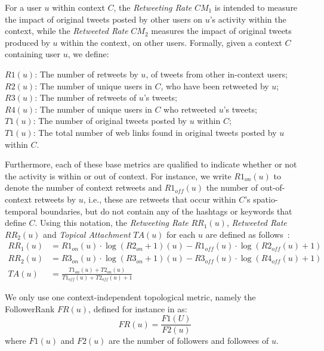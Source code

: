 \documentclass[runningheads]{llncs}
\begin{document}
For a user $u$ within context $C$, the \textit{Retweeting Rate}  $CM_1$ is intended to measure the impact of  original tweets posted  by other users on $u$'s activity within the context, while the \textit{Retweeted Rate} $CM_2$  measures the impact of original tweets produced by $u$ within the context, on other users.
Formally, given a context $C$ containing user $u$, we define:

\noindent 
$R1(u)$: The number of retweets by $u$, of tweets from other in-context users;\\
$R2(u)$: The number of unique users in $C$, who have been retweeted by $u$; \\
$R3(u)$: The number of retweets of $u$'s  tweets; \\
$R4(u)$: The number of unique users in $C$ who retweeted $u$'s tweets; \\
$T1(u)$: The number of original tweets posted by $u$ within $C$; \\
$T1(u)$: The total number of web links found in original tweets posted by $u$ within $C$.

Furthermore, each of these base metrics  are qualified to indicate whether or not the activity is within or out of context.
For instance, we write $R1_{on}(u)$ to denote the number of context retweets and $R1_{off}(u)$ the number of out-of-context retweets by $u$, i.e., these are retweets that occur within $C$'s spatio-temporal boundaries, but do not contain any of the hashtags or keywords that define $C$.  
Using this notation, the \textit{Retweeting Rate} $RR_1(u)$, \textit{Retweeted Rate} $RR_2(u)$ and \textit{Topical Attachment} $TA(u)$ for each $u$ are defined as follows~\cite{Bizid:2015}:
\begin{align}
RR_1(u) & =  R1_{on}(u) \cdot \log(R2_{on}+1)(u) - R1_{off}(u) \cdot \log(R2_{off}(u)+1) \\
RR_2(u) & =  R3_{on}(u) \cdot \log(R3_{on}+1)(u) - R3_{off}(u) \cdot \log(R4_{off}(u)+1) \\
TA(u) & = \frac{T1_{on}(u) + T2_{on}(u)}{T1_{off}(u) + T2_{off}(u) +1} 
\end{align}

We only use one context-independent topological metric, namely the  FollowerRank $FR(u)$, defined for instance in \cite{RIQUELME2016949} as:
\begin{equation}
FR(u) = \frac{F1(U)}{F2(u)}
\end{equation}
where $F1(u)$ and $F2(u)$ are the number of followers and followees of $u$.
\end{document}
